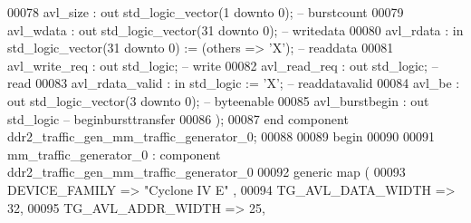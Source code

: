 \begin{DoxyCode}
00078             avl\_size            : \textcolor{keywordflow}{out} \textcolor{comment}{std\_logic\_vector}(\textcolor{vhdllogic}{}\textcolor{vhdllogic}{1} \textcolor{keywordflow}{downto} \textcolor{vhdllogic}{}\textcolor{vhdllogic}{0});                     \textcolor{keyword}{-- burstcount}
00079             avl\_wdata           : \textcolor{keywordflow}{out} \textcolor{comment}{std\_logic\_vector}(\textcolor{vhdllogic}{}\textcolor{vhdllogic}{31} \textcolor{keywordflow}{downto} \textcolor{vhdllogic}{}\textcolor{vhdllogic}{0});                    \textcolor{keyword}{-- writedata}
00080             avl\_rdata           : \textcolor{keywordflow}{in}  \textcolor{comment}{std\_logic\_vector}(\textcolor{vhdllogic}{}\textcolor{vhdllogic}{31} \textcolor{keywordflow}{downto} \textcolor{vhdllogic}{}\textcolor{vhdllogic}{0}) := (\textcolor{keywordflow}{others} => 'X'); \textcolor{keyword}{-- readdata}
00081             avl\_write\_req       : \textcolor{keywordflow}{out} \textcolor{comment}{std\_logic};                                        \textcolor{keyword}{-- write}
00082             avl\_read\_req        : \textcolor{keywordflow}{out} \textcolor{comment}{std\_logic};                                        \textcolor{keyword}{-- read}
00083             avl\_rdata\_valid     : \textcolor{keywordflow}{in}  \textcolor{comment}{std\_logic}                     := 'X';             \textcolor{keyword}{-- readdatavalid}
00084             avl\_be              : \textcolor{keywordflow}{out} \textcolor{comment}{std\_logic\_vector}(\textcolor{vhdllogic}{}\textcolor{vhdllogic}{3} \textcolor{keywordflow}{downto} \textcolor{vhdllogic}{}\textcolor{vhdllogic}{0});                     \textcolor{keyword}{-- byteenable}
00085             avl\_burstbegin      : \textcolor{keywordflow}{out} \textcolor{comment}{std\_logic}\textcolor{keyword}{                                         --
       beginbursttransfer}
00086         );
00087     \textcolor{keywordflow}{end} \textcolor{keywordflow}{component} \textcolor{vhdlchar}{ddr2_traffic_gen_mm_traffic_generator_0};
00088 
00089 \textcolor{vhdlkeyword}{begin}
00090 
00091     mm\_traffic\_generator\_0 : \textcolor{keywordflow}{component} ddr2\_traffic\_gen\_mm\_traffic\_generator\_0
00092         \textcolor{keywordflow}{generic} \textcolor{keywordflow}{map} (
00093             DEVICE\_FAMILY                          => \textcolor{keyword}{"Cyclone IV E"}  ,
00094             TG\_AVL\_DATA\_WIDTH                      => \textcolor{vhdllogic}{32},
00095             TG\_AVL\_ADDR\_WIDTH                      => \textcolor{vhdllogic}{25},

\end{DoxyCode}
